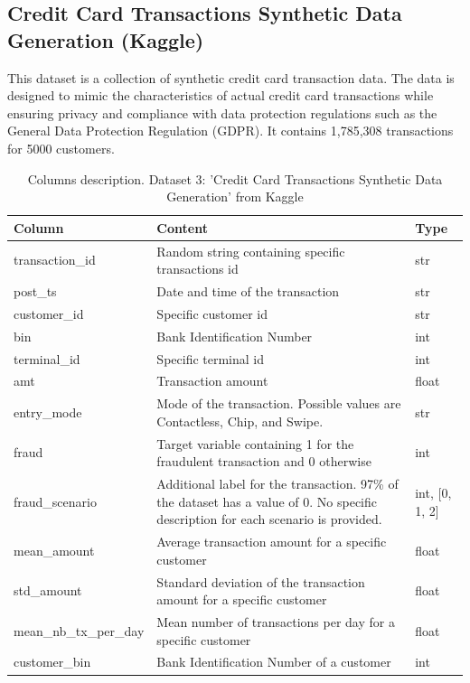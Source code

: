 \documentclass[12pt,a4paper, hidelinks]{article}
\begin{document}
\subsection{Credit Card Transactions Synthetic Data Generation (Kaggle)}

This dataset is a collection of synthetic credit card transaction data. The data is designed to mimic the characteristics of actual credit card transactions while ensuring privacy and compliance with data protection regulations such as the General Data Protection Regulation (GDPR). It contains 1,785,308 transactions for 5000 customers.

\begin{table}[ht!]
    \centering
    \begin{tabular}{|p{4.5cm}|p{8cm}|p{2cm}|}
    \hline
    \textbf{Column} & \textbf{Content} & \textbf{Type} \\
    \hline
    transaction\_id & Random string containing specific transactions id & str \\
    \hline
    post\_ts & Date and time of the transaction & str \\
    \hline
    customer\_id & Specific customer id & str \\
    \hline
    bin & Bank Identification Number & int \\
    \hline
    terminal\_id & Specific terminal id & int \\
    \hline
    amt & Transaction amount & float \\
    \hline
    entry\_mode & Mode of the transaction. Possible values are Contactless, Chip, and Swipe. & str \\
    \hline 
    fraud & Target variable containing 1 for the fraudulent transaction and 0 otherwise & int \\
    \hline
    fraud\_scenario & Additional label for the transaction. 97\% of the dataset has a value of 0. No specific description for each scenario is provided.  & int, [0, 1, 2] \\
    \hline
    mean\_amount & Average transaction amount for a specific customer  & float \\
    \hline
    std\_amount & Standard deviation of the transaction amount for a specific customer  & float \\
    \hline
    mean\_nb\_tx\_per\_day & Mean number of transactions per day for a specific customer & float \\
    \hline
    customer\_bin & Bank Identification Number of a customer & int \\
    \hline
    \end{tabular}
    \caption{Columns description. Dataset 3: 'Credit Card Transactions Synthetic Data Generation' from Kaggle}
\end{table}
\end{document}
